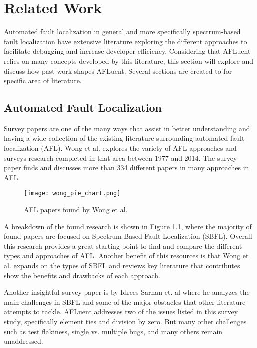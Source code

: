 \chapter{Related Work}
\label{ch:relatedwork}

Automated fault localization in general and more specifically spectrum-based
fault localization have extensive literature exploring the different approaches
to facilitate debugging and increase developer efficiency. Considering that
AFLuent relies on many concepts developed by this literature, this section will
explore and discuss how past work shapes AFLuent. Several sections are created
to for specific area of literature.

\section{Automated Fault Localization}
\label{sec:AFLlit}

Survey papers are one of the many ways that assist in better
understanding and having a wide collection of the existing
literature surrounding automated fault localization (AFL).
Wong et al. \cite{wong2016survey} explores the variety of AFL approaches and
surveys research completed in that area between 1977 and 2014. The survey paper finds and
discusses more than 334 different papers in many approaches in AFL.

\begin{figure}[!htb]
	\begin{center}
		\texttt{[image: wong\_pie\_chart.png]}
		\caption{\label{fig:wong_breakdown} AFL papers found by Wong et al. \cite{wong2016survey}}
	\end{center}
\end{figure}

A breakdown of the found research is shown in Figure \ref{fig:wong_breakdown}, where the
majority of found papers are focused on Spectrum-Based Fault Localization (SBFL).
Overall this research provides a great
starting point to find and compare the different types and approaches of AFL.
Another benefit of this resources is that
Wong et al. \cite{wong2016survey} expands on the types of SBFL
and reviews key literature that contributes show the benefits and drawbacks of
each approach.

Another insightful survey paper is by Idrees Sarhan et. al \cite{sarhan2022Challenges}
where he analyzes the main challenges in SBFL and some of
the major obstacles that other literature attempts to tackle. AFLuent addresses
two of the issues listed in this survey study, specifically element ties and
division by zero. But many other challenges such as test flakiness, single vs.
multiple bugs, and many others remain unaddressed.

